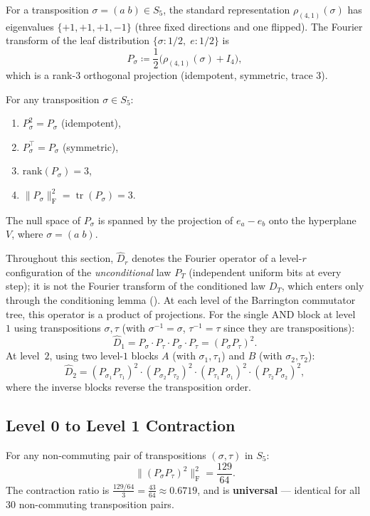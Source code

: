 \documentclass[version=final]{iacrcc}
\DeclareMathOperator{\tr}{tr}
\newcommand{\norm}[1]{\lVert #1 \rVert}
\newcommand{\frob}[1]{\norm{#1}_{\mathrm{F}}}
\newcommand{\Dhat}{\widehat{D}}
\begin{document}
For a transposition $\sigma = (a\;b) \in S_5$, the standard representation
$\rho_{(4,1)}(\sigma)$ has eigenvalues $\{+1, +1, +1, -1\}$ (three fixed
directions and one flipped). The Fourier transform of the leaf distribution
$\{\sigma : 1/2,\; e : 1/2\}$ is
\[
P_\sigma \coloneqq \frac{1}{2}\bigl(\rho_{(4,1)}(\sigma) + I_4\bigr),
\]
which is a rank-$3$ orthogonal projection (idempotent, symmetric, trace $3$).

\begin{lemma}
\label{lem:proj_basic}
For any transposition $\sigma \in S_5$:
\begin{enumerate}[label=(\alph*),nosep]
\item $P_\sigma^2 = P_\sigma$ (idempotent),
\item $P_\sigma^\top = P_\sigma$ (symmetric),
\item $\mathrm{rank}(P_\sigma) = 3$,
\item $\frob{P_\sigma}^2 = \tr(P_\sigma) = 3$.
\end{enumerate}
\end{lemma}

The null space of $P_\sigma$ is spanned by the projection of $e_a - e_b$
onto the hyperplane $V$, where $\sigma = (a\;b)$.

Throughout this section, $\Dhat_r$ denotes the Fourier operator of a level-$r$
configuration of the \emph{unconditional} law $P_T$ (independent uniform bits at
every step); it is not the Fourier transform of the conditioned law $D_T$, which
enters only through the conditioning lemma ().
At each level of the Barrington commutator tree, this operator is a product
of projections. For the single AND block at level~$1$ using transpositions $\sigma, \tau$
(with $\sigma^{-1} = \sigma$, $\tau^{-1} = \tau$ since they are transpositions):
\[
\Dhat_1 = P_\sigma \cdot P_\tau \cdot P_\sigma \cdot P_\tau = (P_\sigma P_\tau)^2.
\]
At level~$2$, using two level-$1$ blocks $A$ (with $\sigma_1, \tau_1$) and
$B$ (with $\sigma_2, \tau_2$):
\[
\Dhat_2 = (P_{\sigma_1} P_{\tau_1})^2 \cdot (P_{\sigma_2} P_{\tau_2})^2
\cdot (P_{\tau_1} P_{\sigma_1})^2 \cdot (P_{\tau_2} P_{\sigma_2})^2,
\]
where the inverse blocks reverse the transposition order.


\subsection{Level 0 to Level 1 Contraction}

\begin{theorem}
\label{thm:level01}
For any non-commuting pair of transpositions $(\sigma, \tau)$ in $S_5$:
\[
\frob{(P_\sigma P_\tau)^2}^2 = \frac{129}{64}.
\]
The contraction ratio is $\frac{129/64}{3} = \frac{43}{64} \approx 0.6719$,
and is \textbf{universal} --- identical for all $30$ non-commuting transposition pairs.
\end{theorem}
\end{document}
